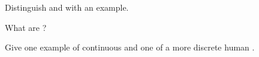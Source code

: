 \begin{exercise}[$\star$]\label{exo:g7:heredity:3}
Distinguish  and  with an example.
\end{exercise}

\begin{exercise}[$\star$]\label{exo:g7:heredity:4}
What are ?
\end{exercise}

\begin{exercise}[$\star$]\label{exo:g7:heredity:5}
Give one example of continuous  and one of a more discrete human
.
\end{exercise}

